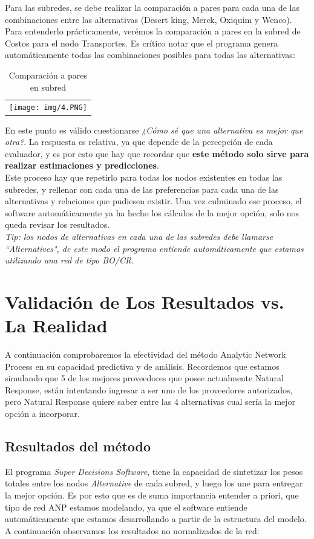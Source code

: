 \documentclass[12pt,letterpaper]{article}
\begin{document}
\newpage
Para las subredes, se debe realizar la comparación a pares para cada una de las combinaciones entre las alternativas (Desert king, Merck, Oxiquim y Wenco). Para entenderlo prácticamente, verémos la comparación a pares en la subred de Costos para el nodo Transportes. Es crítico notar que el programa genera automáticamente todas las combinaciones posibles para todas las alternativas:

\begin{table}[h]
\centering
\begin{tabular}{c}
\texttt{[image: img/4.PNG]}
\end{tabular}
\caption{Comparación a pares en subred}
\label{tab:comparacion a pares}
\end{table}

En este punto es válido cuestionarse \textit{¿Cómo sé que una alternativa es mejor que otra?}. La respuesta es relativa, ya que depende de la percepción de cada evaluador, y es por esto que hay que recordar que \textbf{este método solo sirve para realizar estimaciones y predicciones}.\\

Este proceso hay que repetirlo para todas los nodos existentes en todas las subredes, y rellenar con cada una de las preferencias para cada una de las alternativas y relaciones que pudiesen existir. Una vez culminado ese proceso, el software automáticamente ya ha hecho los cálculos de la mejor opción, solo nos queda revisar los resultados.\\

\textit{Tip: los nodos de alternativas en cada una de las subredes debe llamarse ``Alternatives", de este modo el programa entiende automáticamente que estamos utilizando una red de tipo BO/CR.}

\newpage
\section{Validación de Los Resultados vs. La Realidad}
A continuación comprobaremos la efectividad del método Analytic Network Process en su capacidad predictiva y de análisis. Recordemos que estamos simulando que 5 de los mejores proveedores que posee actualmente Natural Response, están intentando ingresar a ser uno de los proveedores autorizados, pero Natural Response quiere saber entre las 4 alternativas cual sería la mejor opción a incorporar.

\subsection{Resultados del método}
El programa \textit{Super Decisions Software}, tiene la capacidad de sintetizar los pesos totales entre los nodos \textit{Alternative} de cada subred, y luego los une para entregar la mejor opción. Es por esto que es de suma importancia entender a priori, que tipo de red ANP estamos modelando, ya que el software entiende automáticamente que estamos desarrollando a partir de la estructura del modelo.\\
A continuación observamos los resultados no normalizados de la red:
\end{document}
